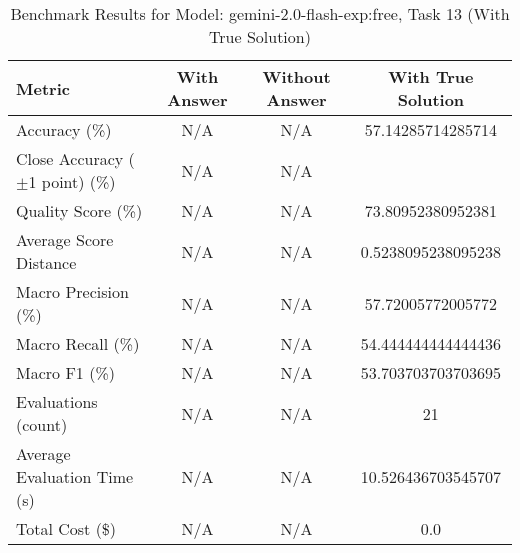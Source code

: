 \begin{table}[htbp]
\centering
\caption{Benchmark Results for Model: gemini-2.0-flash-exp:free, Task 13 (With True Solution)}
\begin{tabular}{lccc}
\toprule
\textbf{Metric} & \textbf{With Answer} & \textbf{Without Answer} & \textbf{With True Solution} \\
\midrule
Accuracy (\%) & N/A & N/A & 57.14285714285714 \\
Close Accuracy ($\pm$1 point) (\%) & N/A & N/A \\
Quality Score (\%) & N/A & N/A & 73.80952380952381 \\
Average Score Distance & N/A & N/A & 0.5238095238095238 \\
Macro Precision (\%) & N/A & N/A & 57.72005772005772 \\
Macro Recall (\%) & N/A & N/A & 54.444444444444436 \\
Macro F1 (\%) & N/A & N/A & 53.703703703703695 \\
Evaluations (count) & N/A & N/A & 21 \\
Average Evaluation Time (s) & N/A & N/A & 10.526436703545707 \\
Total Cost (\$) & N/A & N/A & 0.0 \\
\bottomrule
\end{tabular}
\end{table}